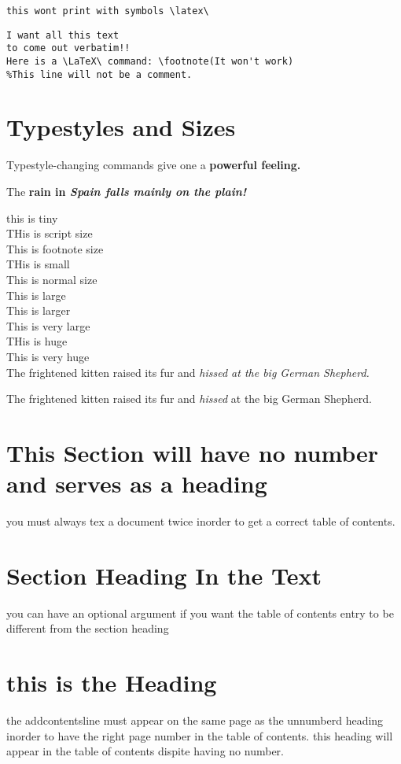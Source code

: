 \verb!this wont print with symbols \latex\ !

\begin{verbatim}
I want all this text
to come out verbatim!!
Here is a \LaTeX\ command: \footnote(It won't work)
%This line will not be a comment.

\end{verbatim}
\section{Typestyles and Sizes}
Typestyle-changing commands give one a \bf powerful \rm feeling.

The \bf rain \rm in \it Spain \rm falls \sl mainly \rm on the \sf plain! \rm

\tiny this is tiny\\
\scriptsize THis is script size\\
\footnotesize This is footnote size\\
\small THis is small\\
\normalsize This is normal size\\
\large This is large\\
\Large This is larger\\
\LARGE This is very large\\
\huge THis is huge\\
\Huge This is very huge\normalsize\\


The \tiny frightened kitten \normalsize raised its fur and \it hissed \rm at the \Large big German Shepherd. \normalsize

The {\tiny frightened kitten} raised its fur and {\it hissed} at the {\Large big German Shepherd.}
\section*{This Section will have no number and serves as a heading}

you must always tex a document twice inorder to get a correct table of contents.
\section[Entry for the T.O.C.]{Section Heading In the Text}
you can have an optional argument if you want the table of contents entry to be different from the section heading
\section*{this is the Heading}
the addcontentsline must appear on the same page as the unnumberd heading inorder to have the right page number in the table of contents. this heading will appear in the table of contents dispite having no number.

